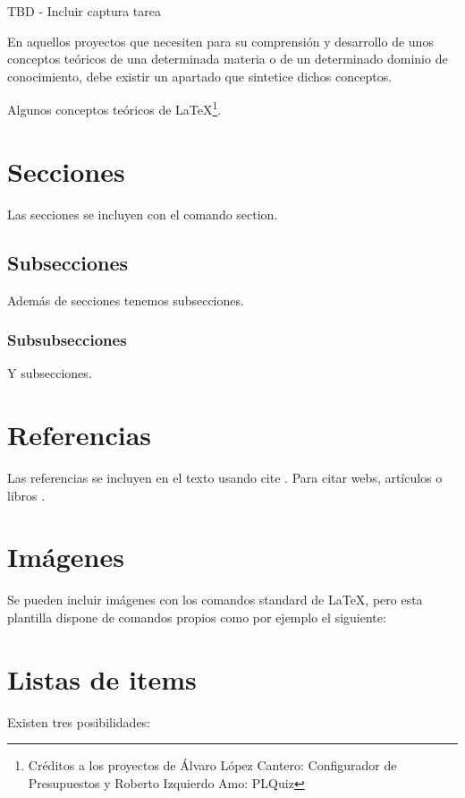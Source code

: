 TBD - Incluir captura tarea

En aquellos proyectos que necesiten para su comprensión y desarrollo de unos conceptos teóricos de una determinada materia o de un determinado dominio de conocimiento, debe existir un apartado que sintetice dichos conceptos.

Algunos conceptos teóricos de \LaTeX \footnote{Créditos a los proyectos de Álvaro López Cantero: Configurador de Presupuestos y Roberto Izquierdo Amo: PLQuiz}.

\section{Secciones}

Las secciones se incluyen con el comando section.

\subsection{Subsecciones}

Además de secciones tenemos subsecciones.

\subsubsection{Subsubsecciones}

Y subsecciones. 


\section{Referencias}

Las referencias se incluyen en el texto usando cite \cite{wiki:latex}. Para citar webs, artículos o libros \cite{koza92}.


\section{Imágenes}

Se pueden incluir imágenes con los comandos standard de \LaTeX, pero esta plantilla dispone de comandos propios como por ejemplo el siguiente:


\section{Listas de items}

Existen tres posibilidades:

